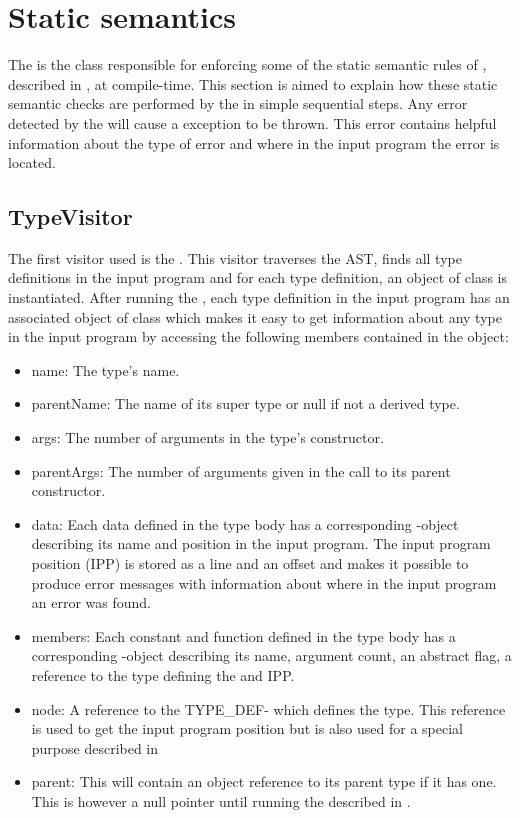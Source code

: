 \section{Static semantics}
The  is the class responsible for enforcing some of the static semantic rules of \productname{}, described in , at compile-time. This section is aimed to explain how these static semantic checks are performed by the  in simple sequential steps. Any error detected by the  will cause a  exception to be thrown. This error contains helpful information about the type of error and where in the input program the error is located. 

\subsection{TypeVisitor}
The first visitor used is the . This visitor traverses the AST, finds all type definitions in the input program and for each type definition, an object of class  is instantiated. After running the , each type definition in the input program has an associated object of class  which makes it easy to get information about any type in the input program by accessing the following members contained in the  object:
\begin{itemize}
\item {} name: The type's name.
\item {} parentName: The name of its super type or null if not a derived type.
\item {} args: The number of arguments in the type's constructor.
\item {} parentArgs: The number of arguments given in the call to its parent constructor.
\item {} data: Each data defined in the type body has a corresponding -object describing its name and position in the input program. The input program position (IPP) is stored as a line and an offset and makes it possible to produce error messages with information about where in the input program an error was found.
\item {} members: Each constant and function defined in the type body has a corresponding -object describing its name, argument count, an abstract flag, a  reference to the type defining the  and IPP.
\item {} node: A reference to the TYPE\_DEF- which defines the type. This reference is used to get the input program position but is also used for a special purpose described in  
\item {} parent: This will contain an object reference to its parent type if it has one. This is however a null pointer until running the  described in .
\end{itemize}

